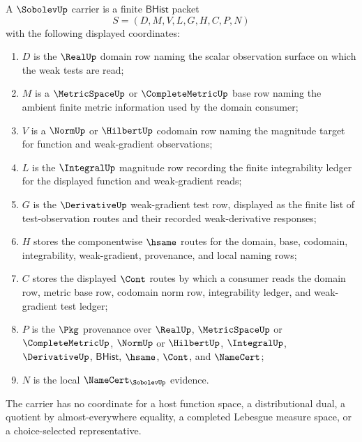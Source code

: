 \begin{definition}
\label{def:sobolev-bhist-carrier}
A $\SobolevUp$ carrier is a finite $\mathsf{BHist}$ packet
$$
S=(D,M,V,L,G,H,C,P,N)
$$
with the following displayed coordinates:
\begin{enumerate}
\item $D$ is the $\RealUp$ domain row naming the scalar observation surface on which the weak tests are read;
\item $M$ is a $\MetricSpaceUp$ or $\CompleteMetricUp$ base row naming the ambient finite metric information used by the domain consumer;
\item $V$ is a $\NormUp$ or $\HilbertUp$ codomain row naming the magnitude target for function and weak-gradient observations;
\item $L$ is the $\IntegralUp$ magnitude row recording the finite integrability ledger for the displayed function and weak-gradient reads;
\item $G$ is the $\DerivativeUp$ weak-gradient test row, displayed as the finite list of test-observation routes and their recorded weak-derivative responses;
\item $H$ stores the componentwise $\hsame$ routes for the domain, base, codomain, integrability, weak-gradient, provenance, and local naming rows;
\item $C$ stores the displayed $\Cont$ routes by which a consumer reads the domain row, metric base row, codomain norm row, integrability ledger, and weak-gradient test ledger;
\item $P$ is the $\Pkg$ provenance over $\RealUp$, $\MetricSpaceUp$ or $\CompleteMetricUp$, $\NormUp$ or $\HilbertUp$, $\IntegralUp$, $\DerivativeUp$, $\mathsf{BHist}$, $\hsame$, $\Cont$, and $\NameCert$;
\item $N$ is the local $\NameCert_{\SobolevUp}$ evidence.
\end{enumerate}
The carrier has no coordinate for a host function space, a distributional dual, a quotient by almost-everywhere equality, a completed Lebesgue measure space, or a choice-selected representative.
\end{definition}


